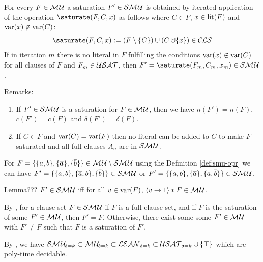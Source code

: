 \documentclass{report}
\begin{document}
\begin{defi}\label{def:smu-opr}
\cite{h29} For every $F \in \mathcal{M\hspace{0.8pt}U}$ a saturation $F' \in \mathcal{S}\mathcal{M\hspace{0.8pt}U}$ is obtained by iterated application of the operation $\saturate(F,C,x)$ as follows where $C \in F$, $x \in \operatorname{lit}(F)$ and $\operatorname{var}(x) \not \in \operatorname{var}(C)$:
  \begin{displaymath}
    \saturate(F,C,x) := (F \sm \set{C}) \cup (C \addcup \set{x}) \in \Cls
  \end{displaymath}
If in iteration $m$ there is no literal in $F$ fulfilling the conditions $\operatorname{var}(x) \not \in \operatorname{var}(C)$ for all clauses of $F$ and $F_m \in \mathcal{USAT}$, then $F' =\saturate(F_m,C_m,x_m) \in \Smusat$. 
\end{defi}
Remarks:
  \begin{enumerate}
  \item If $F' \in \mathcal{S}\mathcal{M\hspace{0.8pt}U}$ is a saturation for $F \in \mathcal{M\hspace{0.8pt}U}$, then we have $n(F')=n(F)$, $c(F')=c(F)$ and $\delta(F')=\delta(F)$.
  \item If $C \in F$ and $\operatorname{var}(C) = \operatorname{var}(F)$ then no literal can be added to $C$ to make $F$ saturated and all full clauses $A_n$ are in $\mathcal{S}\mathcal{M\hspace{0.8pt}U}$.
  \end{enumerate} 
  
\begin{examp}\label{exp:smu-exp}
  For $F = \{ \{ a,b \},\{ \overline{a} \},\{ \overline{b} \} \} \in \mathcal{M\hspace{0.8pt}U} \setminus \mathcal{S}\mathcal{M\hspace{0.8pt}U}$ using the Definition \ref{def:smu-opr} we can have $F'=\{ \{ a,b \},\{ \overline{a},b \},\{ \overline{b} \} \} \in \mathcal{S}\mathcal{M\hspace{0.8pt}U}$ or $F'=\{ \{ a,b \},\{ \overline{a} \},\{ a,\overline{b} \} \} \in \mathcal{S}\mathcal{M\hspace{0.8pt}U}$.
\end{examp}

\begin{lem}\label{lem:smu-mu}
Lemma???  $F' \in \mathcal{S}\mathcal{M\hspace{0.8pt}U}$ iff for all $v \in \operatorname{var}(F)$, $\langle v \rightarrow 1 \rangle*F \in \mathcal{M\hspace{0.8pt}U}$.
\end{lem}

\begin{lem}\label{lem:smu-app}
By \cite{h9}, for a clause-set $F \in \mathcal{S}\mathcal{M\hspace{0.8pt}U}$ if $F$ is a full clause-set, and if $F$ is the saturation of some $F' \in \mathcal{M\hspace{0.8pt}U}$, then $F' = F$. Otherwise, there exist some some $F' \in \mathcal{M\hspace{0.8pt}U}$ with $F' \not= F$ such that $F$ is a saturation of $F'$.
\end{lem}

\begin{lem}\label{lem:smu-mu}
By \cite{h27}, we have $ \mathcal{S}\mathcal{M\hspace{0.8pt}U}_{\!\delta=k} \subset \mathcal{M\hspace{0.8pt}U}_{\!\delta=k} \subset \mathcal{LEAN}_{\delta=k} \subset \mathcal{USAT}_{\delta=k} \cup \{ \top \} $ which are poly-time decidable.
\end{lem}
\end{document}
